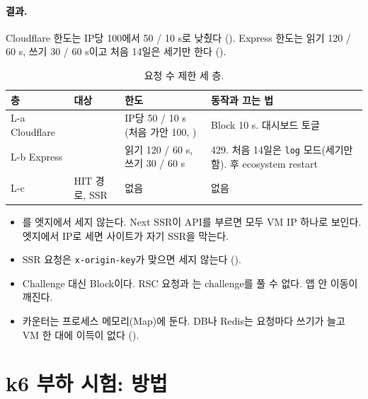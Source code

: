 \paragraph{결과.}
Cloudflare 한도는 IP당 100에서 50 / 10 s로 낮췄다 ().
Express 한도는 읽기 120 / 60 s, 쓰기 30 / 60 s이고 처음 14일은 세기만 한다 ().

\begin{table}[H]
  \caption{요청 수 제한 세 층.}\label{tab:07-layers}
  \small
  \begin{tabularx}{\linewidth}{L{2.4cm} L{3cm} L{3.8cm} Y}
    \toprule
    층 & 대상 & 한도 & 동작과 끄는 법 \\
    \midrule
    L-a Cloudflare &  & IP당 50 / 10 s (처음 가안 100, ) & Block 10 s. 대시보드 토글 \\
    \midrule
    L-b Express &  & 읽기 120 / 60 s, 쓰기 30 / 60 s & 429. 처음 14일은 \texttt{log} 모드(세기만 함).  후 ecosystem restart \\
    \midrule
    L-c & HIT 경로, SSR & 없음 & 없음 \\
    \bottomrule
  \end{tabularx}
\end{table}

\begin{itemize}[nosep]
  \item {}를 엣지에서 세지 않는다. Next SSR이 API를 부르면 모두 VM IP 하나로 보인다. 엣지에서 IP로 세면 사이트가 자기 SSR을 막는다.
  \item SSR 요청은 \texttt{x-origin-key}가 맞으면 세지 않는다 ().
  \item Challenge 대신 Block이다. RSC 요청과 는 challenge를 풀 수 없다. 앱 안 이동이 깨진다.
  \item 카운터는 프로세스 메모리(Map)에 둔다. DB나 Redis는 요청마다 쓰기가 늘고 VM 한 대에 이득이 없다 ().
\end{itemize}

\section{k6 부하 시험: 방법}\label{sec:07-k6}

